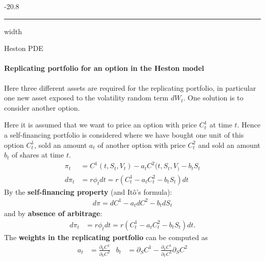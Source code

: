 \documentclass[a4paper,landscape,7pt,fleqn]{scrartcl}
\makeatletter
\renewcommand{\emph}[1]{\textbf{#1}}
\renewcommand{\subsubsection}{\@startsection{subsubsection}{1}{0mm}%
{-2\baselineskip}{0.8\baselineskip}%
{\hrule depth 0.2pt width\columnwidth\vspace*{1.2em}\normalsize\bfseries}}
\makeatother
\begin{document}
\begin{multicols*}{3}
\subsubsection{Heston PDE}

\paragraph{Replicating portfolio for an option in the Heston model}
Here three different assets are required for the replicating portfolio, in particular one new asset exposed to the volatility random term $dW_t$. One solution is to consider another option.

Here it is assumed that we want to price an option with price $C_t^1$ at time $t$. Hence a self-financing portfolio is considered where we have bought one unit of this option $C_t^1$, sold an amount $a_t$ of another option with price $C_t^2$ and sold an amount $b_t$ of shares at time $t$.
\begin{align*}
\pi_t &= C^1(t,S_t,V_t) - a_t C^2(t,S_t,V_) - b_t S_t \\
d \pi_t &= r \phi_t dt = r(C_t^1 - a_t C_t^2 - b_t S_t) dt
\end{align*}
By the \emph{self-financing property} (and Itô's formula):
\begin{align*}
d\pi = dC^1 - a_t dC^2 - b_t dS_t
\end{align*}
and by \emph{absence of arbitrage}:
\begin{align*}
d \pi_t &= r \phi_t dt = r(C_t^1 - a_t C_t^2 - b_t S_t) dt.
\end{align*}
The \emph{weights in the replicating portfolio} can be computed as
\begin{align*}
a_t &= \frac{\partial_V C^1}{\partial_V C^2} & b_t &= \partial_S C^1 - \frac{\partial_V C^1}{\partial_V C^2} \partial_S C^2
\end{align*}


\end{multicols*}
\end{document}
